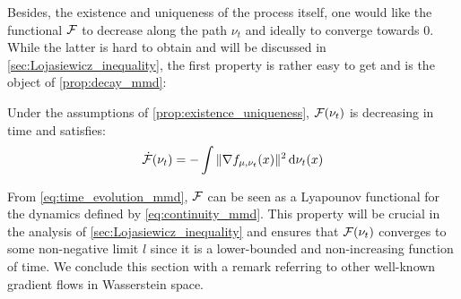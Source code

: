 Besides, the existence and uniqueness of the process itself, one would like the functional ${{\mathcal F}}$ to decrease along the path $\nu_t$ and ideally to converge towards $0$. While the latter is hard to obtain and will be discussed in \cref{sec:Lojasiewicz_inequality}, the first property is rather easy to get and is the object of \cref{prop:decay_mmd}:
\begin{proposition}\label{prop:decay_mmd}
	Under the assumptions of \cref{prop:existence_uniqueness}, ${{\mathcal F}}(\nu_t)$ is decreasing in time and satisfies:
	\begin{align}\label{eq:time_evolution_mmd}
		\dot{{{\mathcal F}}}(\nu_t)= - \int \Vert \nabla f_{\mu,\nu_t}(x) \Vert^2 \mathop{}\!\mathrm{d} \nu_t(x)  
	\end{align}
\end{proposition}
From \cref{eq:time_evolution_mmd}, ${{\mathcal F}}$ can be seen as a Lyapounov functional for the dynamics defined by \cref{eq:continuity_mmd}. This property will be crucial in the analysis of \cref{sec:Lojasiewicz_inequality} and ensures that ${{\mathcal F}}(\nu_t)$  converges to some non-negative limit $l$ since it is a lower-bounded and non-increasing function of time. We conclude this section with a remark referring to other well-known gradient flows in Wasserstein space.
